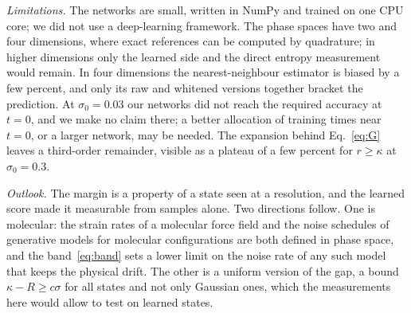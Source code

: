 \emph{Limitations.} The networks are small, written in NumPy and trained on one CPU core; we did not use a deep-learning framework. The phase spaces have two and four dimensions, where exact references can be computed by quadrature; in higher dimensions only the learned side and the direct entropy measurement would remain. In four dimensions the nearest-neighbour estimator is biased by a few percent, and only its raw and whitened versions together bracket the prediction. At $\sigma_0 = 0.03$ our networks did not reach the required accuracy at $t = 0$, and we make no claim there; a better allocation of training times near $t = 0$, or a larger network, may be needed. The expansion behind Eq.~\eqref{eq:G} leaves a third-order remainder, visible as a plateau of a few percent for $r \geq \kappa$ at $\sigma_0 = 0.3$.

\emph{Outlook.} The margin is a property of a state seen at a resolution, and the learned score made it measurable from samples alone. Two directions follow. One is molecular: the strain rates of a molecular force field and the noise schedules of generative models for molecular configurations are both defined in phase space, and the band~\eqref{eq:band} sets a lower limit on the noise rate of any such model that keeps the physical drift. The other is a uniform version of the gap, a bound $\kappa - R \geq c\sigma$ for all states and not only Gaussian ones, which the measurements here would allow to test on learned states.
